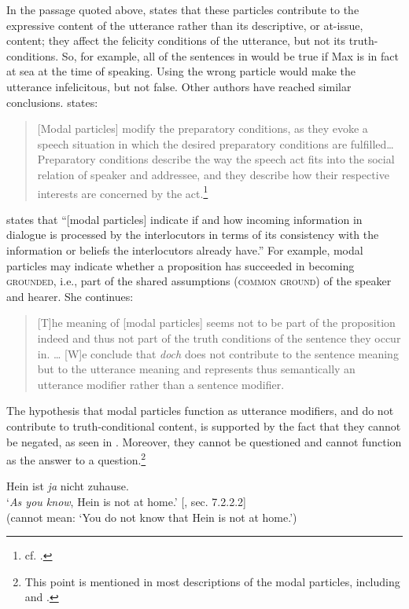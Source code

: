 In the passage quoted above, \citet{Zimmermann2011} states that these particles contribute to the expressive content of the utterance rather than its descriptive, or at-issue, content; they affect the felicity conditions of the utterance, but not its truth-conditions. So, for example, all of the sentences in  would be true if Max is in fact at sea at the time of speaking. Using the wrong particle would make the utterance infelicitous, but not false. Other authors have reached similar conclusions. \citet{Waltereit2001} states:


\begin{quote}
{}[Modal particles] modify the preparatory conditions, as they evoke a speech situation in which the desired preparatory conditions are fulfilled… Preparatory conditions describe the way the speech act fits into the social relation of speaker and addressee, and they describe how their respective interests are concerned by the act.\footnote{cf. \citet{Searle1969}.}
\end{quote}


\citet{Karagjosova2000} states that “[modal particles] indicate if and how incoming information in dialogue is processed by the interlocutors in terms of its consistency with the information or beliefs the interlocutors already have.” For example, modal particles may indicate whether a proposition has succeeded in becoming \textsc{grounded}, i.e., part of the shared assumptions (\textsc{common ground}) of the speaker and hearer. She continues:


\begin{quote}
{}[T]he meaning of [modal particles] seems not to be part of the proposition indeed and thus not part of the truth conditions of the sentence they occur in. …  [W]e conclude that \textit{doch} does not contribute to the sentence meaning but to the utterance meaning and represents thus semantically an utterance modifier rather than a sentence modifier.
\end{quote}


The hypothesis that  modal particles function as utterance modifiers, and do not contribute to truth-conditional content, is supported by the fact that they cannot be negated, as seen in . Moreover, they cannot be questioned and cannot function as the answer to a question.\footnote{This point is mentioned in most descriptions of the  modal particles, including \citet{Bross2012} and \citet{Gutzmann2015}.}


\ea \label{ex:11.28}
Hein ist \textit{ja} nicht zuhause.\\
\glt ‘\textit{As you know}, Hein is not at home.’  [\citealt{Gutzmann2015}, sec. 7.2.2.2]\\
(cannot mean: ‘You do not know that Hein is not at home.’)
\z

